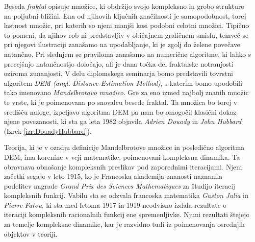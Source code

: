 \documentclass[12pt,a4paper]{amsart}
\theoremstyle{definition} %
\theoremstyle{plain} %
\begin{document}
Beseda {\em fraktal} opisuje množice, ki obdržijo svojo kompleksno in grobo strukturo na poljubni bližini. 
Ena od njihovih ključnih značilnosti je samopodobnost, torej lastnost množic, pri katerih so njeni manjši kosi podobni celotni množici.
Tipično to pomeni, da njihov rob ni predstavljiv v običajnem grafičnem smislu, temveč se pri njegovi ilustraciji zanašamo na upodabljanje, 
ki je zgolj do želene povečave natančno. Pri slednjem se praviloma zanašamo na numerične algoritme, ki lahko s precejšnjo natančnostjo določajo,
ali je dana točka del fraktalske notranjosti oziroma zunanjosti. 
V delu diplomskega seminarja bomo predstavili tovrstni algoritem {\em DEM (angl. Distance Estimation Method)}, 
s katerim bomo upodobili tako imenovano {\em Mandelbrotovo množico}. Gre za eno izmed najbolj znanih množic te vrste,
ki je poimenovana po snovalcu besede fraktal. Ta množica bo torej v središču naloge, 
izpeljavo algoritma DEM pa nam bo omogočil klasični dokaz njene povezanosti, 
ki sta ga leta 1982 objavila {\em Adrien Douady} in {\em John Hubbard}  (Izrek \ref{izr:DouadyHubbard}).

Teorija, ki je v ozadju definicije Mandelbrotove množice in posledično algoritma DEM, 
ima korenine v veji matematike, poimenovani kompleksna dinamika. 
Ta obravnava obnašanje kompleksnih preslikav pod zaporednimi iteracijami.
Njeni začetki segajo v leto 1915, ko je Francoska akademija znanosti naznanila podelitev nagrade {\em Grand Prix des Sciences Mathematiques} za študijo iteracij kompleksnih funkcij. Vabilu sta se odzvala francoska matematika {\em Gaston Julia} in {\em Pierre Fatou}, ki sta med letoma 1917 in 1919 neodvisno izdala rezultate o iteraciji kompleksnih racionalnih funkcij ene spremenljivke. Njuni rezultati štejejo za temelje kompleksne dinamike, kar je razvidno tudi iz poimenovanja osrednjih objektov v teoriji.
\end{document}

